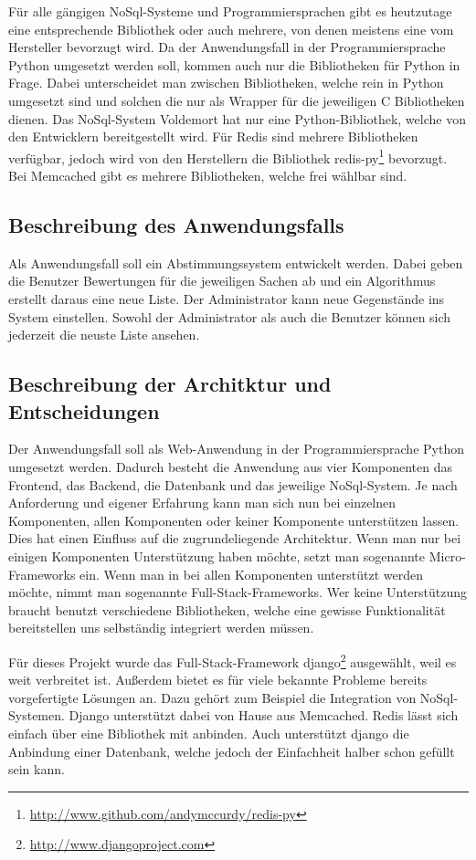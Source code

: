 Für alle gängigen NoSql-Systeme und Programmiersprachen gibt es heutzutage eine
entsprechende Bibliothek oder auch mehrere, von denen meistens eine vom
Hersteller bevorzugt wird. Da der Anwendungsfall in der Programmiersprache
Python umgesetzt werden soll, kommen auch nur die Bibliotheken für Python in
Frage. Dabei unterscheidet man zwischen Bibliotheken, welche rein in Python
umgesetzt sind und solchen die nur als Wrapper für die jeweiligen C Bibliotheken
dienen. Das NoSql-System Voldemort hat nur eine Python-Bibliothek, welche von
den Entwicklern bereitgestellt wird. Für Redis sind mehrere Bibliotheken
verfügbar, jedoch wird von den Herstellern die Bibliothek
redis-py\footnote{\url{http://www.github.com/andymccurdy/redis-py}} bevorzugt.
Bei Memcached gibt es mehrere Bibliotheken, welche frei wählbar sind.

\subsection{Beschreibung des Anwendungsfalls}
Als Anwendungsfall soll ein Abstimmungssystem entwickelt werden. Dabei geben
die Benutzer Bewertungen für die jeweiligen Sachen ab und ein Algorithmus
erstellt daraus eine neue Liste. Der Administrator kann neue Gegenstände ins
System einstellen. Sowohl der Administrator als auch die Benutzer können sich
jederzeit die neuste Liste ansehen.

\subsection{Beschreibung der Architktur und Entscheidungen}
Der Anwendungsfall soll als Web-Anwendung in der Programmiersprache Python
umgesetzt werden. Dadurch besteht die Anwendung aus vier Komponenten das
Frontend, das Backend, die Datenbank und das jeweilige NoSql-System. Je nach
Anforderung und eigener Erfahrung kann man sich nun bei einzelnen Komponenten,
allen Komponenten oder keiner Komponente unterstützen lassen. Dies hat einen
Einfluss auf die zugrundeliegende Architektur. Wenn man nur bei einigen
Komponenten Unterstützung haben möchte, setzt man sogenannte Micro-Frameworks
ein. Wenn man in bei allen Komponenten unterstützt werden möchte, nimmt man
sogenannte Full-Stack-Frameworks. Wer keine Unterstützung braucht benutzt
verschiedene Bibliotheken, welche eine gewisse Funktionalität bereitstellen uns
selbständig integriert werden müssen.

Für dieses Projekt wurde das Full-Stack-Framework
django\footnote{\url{http://www.djangoproject.com}} ausgewählt, weil es weit
verbreitet ist. Außerdem bietet es für viele bekannte Probleme bereits
vorgefertigte Lösungen an. Dazu gehört zum Beispiel die Integration von
NoSql-Systemen. Django unterstützt dabei von Hause aus Memcached. Redis lässt
sich einfach über eine Bibliothek mit anbinden. Auch unterstützt django die
Anbindung einer Datenbank, welche jedoch der Einfachheit halber schon gefüllt
sein kann.

